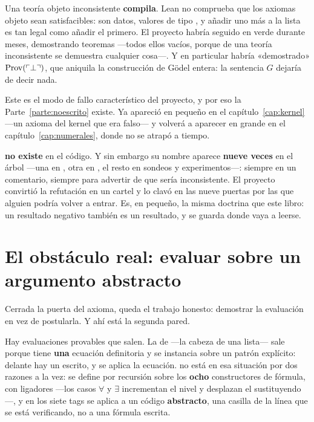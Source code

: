 \begin{muro}
Una teoría objeto inconsistente \textbf{compila}. Lean no comprueba que los axiomas objeto sean
satisfacibles: son datos, valores de tipo , y añadir uno más a la lista es tan legal
como añadir el primero. El proyecto habría seguido en verde durante meses, demostrando teoremas
—todos ellos vacíos, porque de una teoría inconsistente se demuestra cualquier cosa—. Y en
particular habría «demostrado» $\operatorname{Prov}(\ulcorner \bot \urcorner)$, que aniquila la construcción de Gödel entera:
la sentencia $G$ dejaría de decir nada.

Este es el modo de fallo característico del proyecto, y por eso la Parte~\ref{parte:noescrito}
existe. Ya apareció en pequeño en el capítulo~\ref{cap:kernel} —un axioma del kernel que era falso—
y volverá a aparecer en grande en el capítulo~\ref{cap:numerales}, donde no se atrapó a tiempo.
\end{muro}

\begin{observacion}
 \textbf{no existe} en el código. Y sin embargo su nombre aparece
\textbf{nueve veces} en el árbol —una en , otra en
, el resto en sondeos y experimentos—: siempre
en un comentario, siempre para advertir de que sería inconsistente. El proyecto convirtió la
refutación en un cartel y lo clavó en las nueve puertas por las que alguien podría volver a entrar.
Es, en pequeño, la misma doctrina que este libro: un resultado negativo también es un resultado, y
se guarda donde vaya a leerse.
\end{observacion}

\section{El obstáculo real: evaluar sobre un argumento abstracto}

Cerrada la puerta del axioma, queda el trabajo honesto: demostrar la evaluación en vez de
postularla. Y ahí está la segunda pared.

Hay evaluaciones provables que salen. La de  —la cabeza de una lista— sale porque
 tiene \textbf{una} ecuación definitoria y se instancia sobre un patrón explícito:
delante hay un  escrito, y se aplica la ecuación.  no está en esa
situación por dos razones a la vez: se define por recursión sobre los \textbf{ocho} constructores
de fórmula, con ligadores —los casos $\forall$ y $\exists$ incrementan el nivel y desplazan el
sustituyendo—, y en los siete tags se aplica a un código \textbf{abstracto}, una casilla de la
línea que se está verificando, no a una fórmula escrita.

